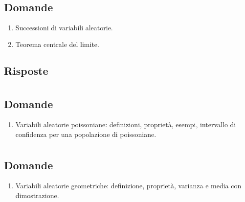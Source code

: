 \documentclass{article}
\begin{document}
\section{}%

\subsection*{Domande}

\begin{enumerate}
    \item Successioni di variabili aleatorie.
    \item Teorema centrale del limite.
\end{enumerate}

\subsection*{Risposte}

\section{}%

\subsection*{Domande}

\begin{enumerate}
    \item Variabili aleatorie poissoniane: definizioni, proprietà, esempi, intervallo di confidenza per una popolazione di poissoniane.
\end{enumerate}

\section{}%

\subsection*{Domande}

\begin{enumerate}
    \item Variabili aleatorie geometriche: definizione, proprietà, varianza e media con dimostrazione.
\end{enumerate}
\end{document}
